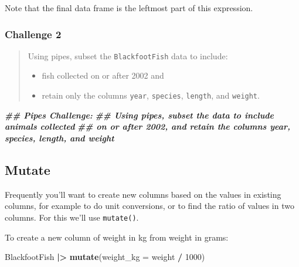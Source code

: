 \documentclass[
  10pt,
  letterpaper,
  twoside,
  openright]{book}
\newenvironment{Shaded}{\begin{snugshade}}{\end{snugshade}}
\newcommand{\AttributeTok}[1]{\textcolor[rgb]{0.13,0.29,0.53}{#1}}
\newcommand{\DecValTok}[1]{\textcolor[rgb]{0.00,0.00,0.81}{#1}}
\newcommand{\DocumentationTok}[1]{\textcolor[rgb]{0.56,0.35,0.01}{\textbf{\textit{#1}}}}
\newcommand{\FunctionTok}[1]{\textcolor[rgb]{0.13,0.29,0.53}{\textbf{#1}}}
\newcommand{\NormalTok}[1]{#1}
\newcommand{\SpecialCharTok}[1]{\textcolor[rgb]{0.81,0.36,0.00}{\textbf{#1}}}
\providecommand{\tightlist}{%
  \setlength{\itemsep}{0pt}\setlength{\parskip}{0pt}}
\begin{document}
Note that the final data frame is the leftmost part of this expression.

\hypertarget{challenge-2}{%
\subsubsection{Challenge 2}\label{challenge-2}}

\begin{quote}
Using pipes, subset the \texttt{BlackfootFish} data to include:

\begin{itemize}
\tightlist
\item
  fish collected on or after 2002 and
\item
  retain only the columns \texttt{year}, \texttt{species},
  \texttt{length}, and \texttt{weight}.
\end{itemize}
\end{quote}

\begin{Shaded}
\begin{Highlighting}[]
\DocumentationTok{\#\# Pipes Challenge:}
\DocumentationTok{\#\#  Using pipes, subset the data to include animals collected}
\DocumentationTok{\#\#  on or after 2002, and retain the columns \textasciigrave{}year\textasciigrave{}, \textasciigrave{}species\textasciigrave{}, \textasciigrave{}length\textasciigrave{}, and \textasciigrave{}weight\textasciigrave{}}
\end{Highlighting}
\end{Shaded}

\hypertarget{mutate}{%
\subsection{Mutate}\label{mutate}}

Frequently you'll want to create new columns based on the values in
existing columns, for example to do unit conversions, or to find the
ratio of values in two columns. For this we'll use \texttt{mutate()}.

To create a new column of weight in kg from weight in grams:

\begin{Shaded}
\begin{Highlighting}[]
\NormalTok{BlackfootFish }\SpecialCharTok{|\textgreater{}}
  \FunctionTok{mutate}\NormalTok{(}\AttributeTok{weight\_kg =}\NormalTok{ weight }\SpecialCharTok{/} \DecValTok{1000}\NormalTok{)}
\end{Highlighting}
\end{Shaded}
\end{document}
